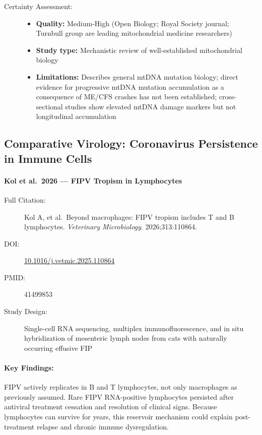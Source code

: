 \begin{description}
    \item[Certainty Assessment:]
    \begin{itemize}
        \item \textbf{Quality:} Medium-High (Open Biology; Royal Society journal; Turnbull group are leading mitochondrial medicine researchers)
        \item \textbf{Study type:} Mechanistic review of well-established mitochondrial biology
        \item \textbf{Limitations:} Describes general mtDNA mutation biology; direct evidence for progressive mtDNA mutation accumulation as a consequence of ME/CFS crashes has not been established; cross-sectional studies show elevated mtDNA damage markers but not longitudinal accumulation
    \end{itemize}
\end{description}

\subsection{Comparative Virology: Coronavirus Persistence in Immune Cells}

\paragraph{Kol et al.\ 2026 --- FIPV Tropism in Lymphocytes}

\begin{description}
    \item[Full Citation:] Kol A, et al.\ Beyond macrophages: FIPV tropism includes T and B lymphocytes. \textit{Veterinary Microbiology}. 2026;313:110864.
    \item[DOI:] \href{https://doi.org/10.1016/j.vetmic.2025.110864}{10.1016/j.vetmic.2025.110864}
    \item[PMID:] 41499853
    \item[Study Design:] Single-cell RNA sequencing, multiplex immunofluorescence, and in situ hybridization of mesenteric lymph nodes from cats with naturally occurring effusive FIP
\end{description}

\paragraph{Key Findings:}
FIPV actively replicates in B and T lymphocytes, not only macrophages as previously assumed. Rare FIPV RNA-positive lymphocytes persisted after antiviral treatment cessation and resolution of clinical signs. Because lymphocytes can survive for years, this reservoir mechanism could explain post-treatment relapse and chronic immune dysregulation.

